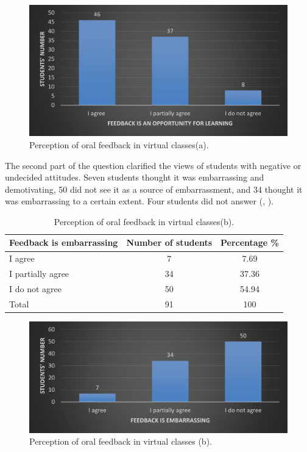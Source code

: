 \documentclass[english]{textolivre}
\begin{document}
\begin{figure}[h!]
 \centering
 \begin{minipage}{.85\textwidth}
 \includegraphics[width=\textwidth]{14.jpg}
 \caption{Perception of oral feedback in virtual classes(a).}
 \label{fig14}
 \end{minipage}
\end{figure}

The second part of the question clarified the views of students with negative or undecided attitudes. Seven students thought it was embarrassing and demotivating, 50 did not see it as a source of embarrassment, and 34 thought it was embarrassing to a certain extent. Four students did not answer (, ).

\begin{table}[h!]
\centering
\begin{threeparttable}
\caption{Perception of oral feedback in virtual classes(b).}
\label{tbl15}
\begin{tabular}{p{} c c}
\toprule
Feedback is embarrassing & Number of students & Percentage \% \\ \midrule
I agree & 7 & 7.69 \\
I partially agree & 34 & 37.36 \\
I do not agree & 50 & 54.94 \\
Total & 91 & 100 \\
\bottomrule
\end{tabular}
\end{threeparttable}
\end{table}

\begin{figure}[h!]
 \centering
 \begin{minipage}{.85\textwidth}
 \includegraphics[width=\textwidth]{15.jpg}
 \caption{Perception of oral feedback in virtual classes (b).}
 \label{fig15}
 \end{minipage}
\end{figure}
\end{document}
